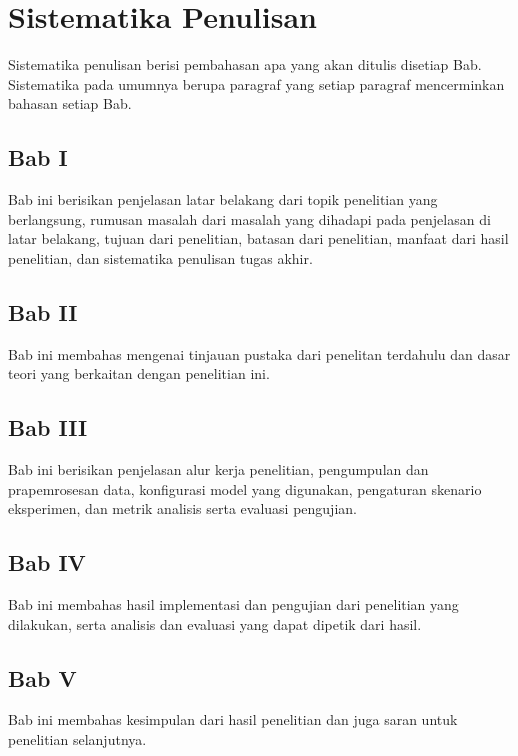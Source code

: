 \section{Sistematika Penulisan} \label{I.Sistematika}
Sistematika penulisan berisi pembahasan apa yang akan ditulis disetiap Bab. Sistematika pada umumnya berupa paragraf yang setiap paragraf mencerminkan bahasan setiap Bab. \par

\subsection*{Bab I}
Bab ini berisikan penjelasan latar belakang dari topik penelitian yang berlangsung, rumusan masalah dari masalah yang dihadapi pada penjelasan di latar belakang, tujuan dari penelitian, batasan dari penelitian, manfaat dari hasil penelitian, dan sistematika penulisan tugas akhir. \par

\subsection*{Bab II}
Bab ini membahas mengenai tinjauan pustaka dari penelitan terdahulu dan dasar teori yang berkaitan dengan penelitian ini.

\subsection*{Bab III}
Bab ini berisikan penjelasan alur kerja penelitian, pengumpulan dan prapemrosesan data, konfigurasi model yang digunakan, pengaturan skenario eksperimen, dan metrik analisis serta evaluasi pengujian.

\subsection*{Bab IV}
Bab ini membahas hasil implementasi dan pengujian dari penelitian yang dilakukan, serta analisis dan evaluasi yang dapat dipetik dari hasil.

\subsection*{Bab V}
Bab ini membahas kesimpulan dari hasil penelitian dan juga saran untuk penelitian selanjutnya.